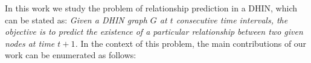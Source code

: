 In this work we study the problem of relationship prediction in a DHIN, which can be stated as: \textit{Given a DHIN graph $G$ at $t$ consecutive time intervals, the objective is to predict the existence of a particular relationship between two given nodes at time $t+1$.} 
In the context of this problem, the main contributions of our work can be enumerated as follows:












